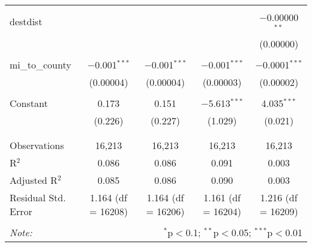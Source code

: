 \begin{table}[!htbp]
\begin{tabular}{@{\extracolsep{5pt}}lcccc}
  & & & & \\ 
 destdist &  &  &  & $-$0.00000$^{**}$ \\ 
  &  &  &  & (0.00000) \\ 
  & & & & \\ 
 mi\_to\_county & $-$0.001$^{***}$ & $-$0.001$^{***}$ & $-$0.001$^{***}$ & $-$0.0001$^{***}$ \\ 
  & (0.00004) & (0.00004) & (0.00003) & (0.00002) \\ 
  & & & & \\ 
 Constant & 0.173 & 0.151 & $-$5.613$^{***}$ & 4.035$^{***}$ \\ 
  & (0.226) & (0.227) & (1.029) & (0.021) \\ 
  & & & & \\ 
\hline \\[-1.8ex] 
Observations & 16,213 & 16,213 & 16,213 & 16,213 \\ 
R$^{2}$ & 0.086 & 0.086 & 0.091 & 0.003 \\ 
Adjusted R$^{2}$ & 0.085 & 0.086 & 0.090 & 0.003 \\ 
Residual Std. Error & 1.164 (df = 16208) & 1.164 (df = 16206) & 1.161 (df = 16204) & 1.216 (df = 16209) \\ 
\hline 
\hline \\[-1.8ex] 
\textit{Note:}  & \multicolumn{4}{r}{$^{*}$p$<$0.1; $^{**}$p$<$0.05; $^{***}$p$<$0.01} \\ 
\end{tabular} 
\end{table} 
